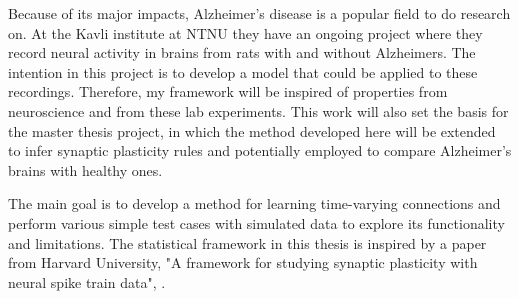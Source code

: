 Because of its major impacts, Alzheimer's disease is a popular field to do research on. At the Kavli institute at NTNU they have an ongoing project where they record neural activity in brains from rats with and without Alzheimers. The intention in this project is to develop a model that could be applied to these recordings. Therefore, my framework will be inspired of properties from neuroscience and from these lab experiments. This work will also set the basis for the master thesis project, in which the method developed here will be extended to infer synaptic plasticity rules and potentially employed to compare Alzheimer's brains with healthy ones. 

The main goal is to develop a method for learning time-varying connections and perform various simple test cases with simulated data to explore its functionality and limitations. The statistical framework in this thesis is inspired by a paper from Harvard University, "A framework for studying synaptic plasticity with neural spike train data", \cite{Linderman}. 